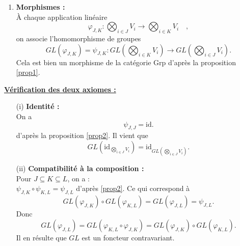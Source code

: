 \documentclass[a4paper, 14pt]{report}
\begin{document}
\begin{onehalfspace}
{\begin{enumerate}
				\item \textbf{Morphismes :} \\
				À chaque application linéaire
				\[
				\varphi_{J,K} : \bigotimes_{i \in J} V_i \to \bigotimes_{i \in K} V_i
				\quad ,
				\]
				on associe l'homomorphisme de groupes
				\[
				GL(\varphi_{J,K}) = \psi_{J,K} : GL\left( \bigotimes_{i \in K} V_i \right) \to GL\left( \bigotimes_{i \in J} V_i \right).
				\]
				Cela est bien un morphisme de la catégorie \( \text{Grp} \) d'après la proposition \ref{prop1}.
			\end{enumerate}
			
			\textbf{ \underline{Vérification des deux axiomes :}}
			
			\begin{itemize}
				\item[(i)] \textbf{Identité :} \\
				On a 
				\[
				\psi_{J,J} = \mathrm{id}.
				\] d'après la proposition  \ref{prop2}. 
				Il vient que
				\[
				GL\left( \mathrm{id}_{\bigotimes_{i \in J} V_i} \right) = \mathrm{id}_{GL\left( \bigotimes_{i \in J} V_i \right)}.
				\]
				
				\item[(ii)] \textbf{Compatibilité à la composition :} \\
				Pour \( J \subseteq K \subseteq L \), on a : \\
				\(\psi_{J,K} \circ \psi_{K,L} = \psi_{J,L}\) d'après \ref{prop2}. 
				Ce qui correspond à
				\[
				GL(\varphi_{J,K}) \circ GL(\varphi_{K,L}) = GL(\varphi_{J,L}) = \psi_{J,L}.
				\]
				Donc
				\[
				GL(\varphi_{J,L}) = GL(\varphi_{K,L} \circ \varphi_{J,K}) = GL(\varphi_{J,K}) \circ GL(\varphi_{K,L}).
				\]
				Il en résulte que \(GL\) est un foncteur contravariant.
			\end{itemize}
			
}
\end{onehalfspace}
\end{document}
